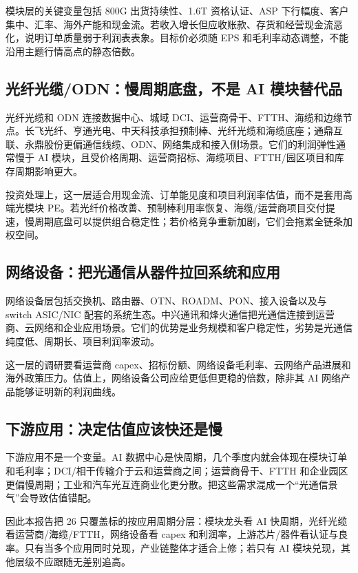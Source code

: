 模块层的关键变量包括 800G 出货持续性、1.6T 资格认证、ASP 下行幅度、客户集中、汇率、海外产能和现金流。若收入增长但应收账款、存货和经营现金流恶化，说明订单质量弱于利润表表象。目标价必须随 EPS 和毛利率动态调整，不能沿用主题行情高点的静态倍数。
\subsection{光纤光缆/ODN：慢周期底盘，不是 AI 模块替代品}
光纤光缆和 ODN 连接数据中心、城域 DCI、运营商骨干、FTTH、海缆和边缘节点。长飞光纤、亨通光电、中天科技承担预制棒、光纤光缆和海缆底座；通鼎互联、永鼎股份更偏通信线缆、ODN、网络集成和接入侧场景。它们的利润弹性通常慢于 AI 模块，且受价格周期、运营商招标、海缆项目、FTTH/园区项目和库存周期影响更大。

投资处理上，这一层适合用现金流、订单能见度和项目利润率估值，而不是套用高端光模块 PE。若光纤价格改善、预制棒利用率恢复、海缆/运营商项目交付提速，慢周期底盘可以提供组合稳定性；若价格竞争重新加剧，它们会拖累全链条加权空间。
\subsection{网络设备：把光通信从器件拉回系统和应用}
网络设备层包括交换机、路由器、OTN、ROADM、PON、接入设备以及与 switch ASIC/NIC 配套的系统生态。中兴通讯和烽火通信把光通信连接到运营商、云网络和企业应用场景。它们的优势是业务规模和客户稳定性，劣势是光通信纯度低、周期长、项目利润率波动。

这一层的调研要看运营商 capex、招标份额、网络设备毛利率、云网络产品进展和海外政策压力。估值上，网络设备公司应给更低但更稳的倍数，除非其 AI 网络产品能够证明新的利润曲线。
\subsection{下游应用：决定估值应该快还是慢}
下游应用不是一个变量。AI 数据中心是快周期，几个季度内就会体现在模块订单和毛利率；DCI/相干传输介于云和运营商之间；运营商骨干、FTTH 和企业园区更偏慢周期；工业和汽车光互连商业化更分散。把这些需求混成一个“光通信景气”会导致估值错配。

因此本报告把 26 只覆盖标的按应用周期分层：模块龙头看 AI 快周期，光纤光缆看运营商/海缆/FTTH，网络设备看 capex 和利润率，上游芯片/器件看认证与良率。只有当多个应用同时兑现，产业链整体才适合上修；若只有 AI 模块兑现，其他层级不应跟随无差别追高。

